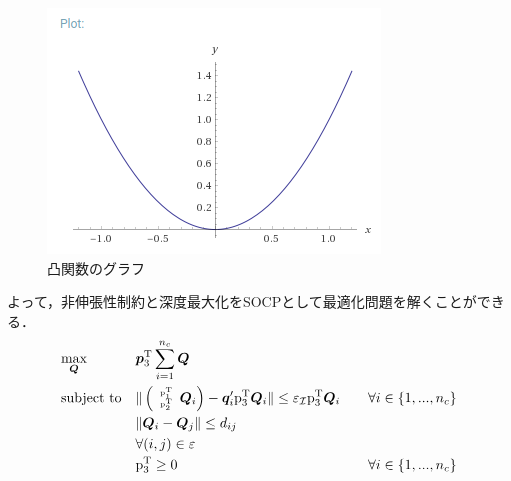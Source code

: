 \documentclass[10.5pt,twocolumn,a4j,fleqn]{ujarticle}
\begin{document}
\begin{figure}[htbp]
 \begin{center}
  \includegraphics[width=\linewidth]{img/socp.png}
  \caption{凸関数のグラフ}
  \label{socp}
 \end{center}
\end{figure}
よって，非伸張性制約と深度最大化をSOCPとして最適化問題を解くことができる．
\begin{equation}
    \begin{aligned}
        & \underset{\bm{Q}} {\text{max}} && {\bm{p}}_3^{\mathrm{T}} \sum_{i=1}^{n_c} \bm{Q}\\
    &\text{subject to} &&
        \tiny
        \| 
        \left(
        \begin{array}{c}
          \mathrm{\bm{p}}_1^{\mathrm{T}}  \\
          \mathrm{\bm{p}}_2^{\mathrm{T}}
        \end{array} \bm{Q}_i
      \right)
      - \bm{q}_i^{\prime}\mathrm{\bm{p}}_3^{\mathrm{T}} \bm{Q}_i \| \le \varepsilon_{\mathcal{I}} \mathrm{\bm{p}}_3^{\mathrm{T}} \bm{Q}_i \normalsize &&& \forall i \in \{1, ..., n_c\}\\
    &                  && \| \bm{Q}_i -\bm{Q}_j\| \le d_{ij} \\ &&& \forall(i, j) \in \varepsilon \\
    &                  && \mathrm{\bm{p}}_3^{\mathrm{T}} \ge 0  &&&  \forall i \in \{1, ..., n_c\}
    \end{aligned}
    \label{eq:socp}
\end{equation}
\end{document}
